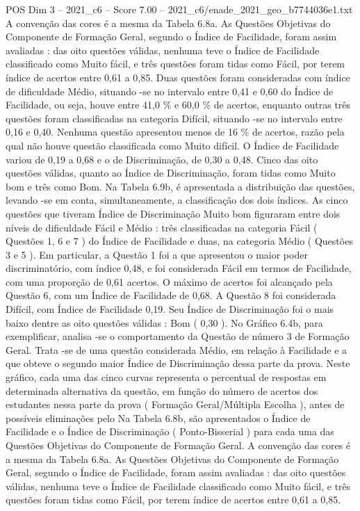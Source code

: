\begin{textsample}{POS Dim 3 – 2021\_c6 – Score 7.00 – 2021\_c6/enade\_2021\_geo\_b7744036e1.txt}
A convenção das cores é a mesma da Tabela 6.8a.
As Questões Objetivas do Componente de Formação Geral, segundo o Índice de Facilidade, foram assim avaliadas : das oito questões válidas, nenhuma teve o Índice de Facilidade classificado como Muito fácil, e três questões foram tidas como Fácil, por terem índice de acertos entre 0,61 a 0,85.
Duas questões foram consideradas com índice de dificuldade Médio, situando -se no intervalo entre 0,41 e 0,60 do Índice de Facilidade, ou seja, houve entre 41,0 \% e 60,0 \% de acertos, enquanto outras três questões foram classificadas na categoria Difícil, situando -se no intervalo entre 0,16 e 0,40.
Nenhuma questão apresentou menos de 16 \% de acertos, razão pela qual não houve questão classificada como Muito difícil.
O Índice de Facilidade variou de 0,19 a 0,68 e o de Discriminação, de 0,30 a 0,48.
Cinco das oito questões válidas, quanto ao Índice de Discriminação, foram tidas como Muito bom e três como Bom.
Na Tabela 6.9b, é apresentada a distribuição das questões, levando -se em conta, simultaneamente, a classificação dos dois índices.
As cinco questões que tiveram Índice de Discriminação Muito bom figuraram entre dois níveis de dificuldade Fácil e Médio : três classificadas na categoria Fácil ( Questões 1, 6 e 7 ) do Índice de Facilidade e duas, na categoria Médio ( Questões 3 e 5 ).
Em particular, a Questão 1 foi a que apresentou o maior poder discriminatório, com índice 0,48, e foi considerada Fácil em termos de Facilidade, com uma proporção de 0,61 acertos.
O máximo de acertos foi alcançado pela Questão 6, com um Índice de Facilidade de 0,68.
A Questão 8 foi considerada Difícil, com Índice de Facilidade 0,19.
Seu Índice de Discriminação foi o mais baixo dentre as oito questões válidas : Bom ( 0,30 ).
No Gráfico 6.4b, para exemplificar, analisa -se o comportamento da Questão de número 3 de Formação Geral.
Trata -se de uma questão considerada Médio, em relação à Facilidade e a que obteve o segundo maior Índice de Discriminação dessa parte da prova.
Neste gráfico, cada uma das cinco curvas representa o percentual de respostas em determinada alternativa da questão, em função do número de acertos dos estudantes nessa parte da prova ( Formação Geral/Múltipla Escolha ), antes de possíveis eliminações pelo Na Tabela 6.8b, são apresentados o Índice de Facilidade e o Índice de Discriminação ( Ponto-Bisserial ) para cada uma das Questões Objetivas do Componente de Formação Geral.
A convenção das cores é a mesma da Tabela 6.8a.
As Questões Objetivas do Componente de Formação Geral, segundo o Índice de Facilidade, foram assim avaliadas : das oito questões válidas, nenhuma teve o Índice de Facilidade classificado como Muito fácil, e três questões foram tidas como Fácil, por terem índice de acertos entre 0,61 a 0,85.

\end{textsample}
